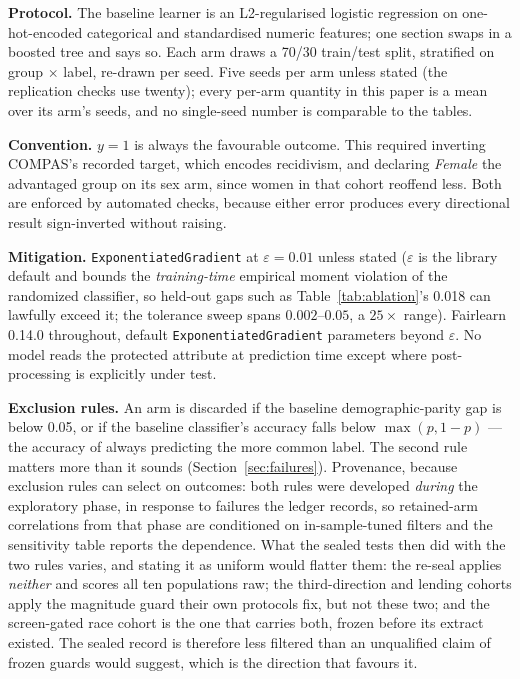 \documentclass[conference]{IEEEtran}
\begin{document}
\textbf{Protocol.} The baseline learner is an L2-regularised logistic regression on
one-hot-encoded categorical and standardised numeric features; one section swaps in a
boosted tree and says so. Each arm draws a 70/30 train/test split, stratified on group
$\times$ label, re-drawn per seed. Five seeds per arm unless stated (the replication
checks use twenty); every per-arm quantity in this paper is a mean over its arm's seeds,
and no single-seed number is comparable to the tables.

\textbf{Convention.} $y = 1$ is always the favourable outcome. This required inverting COMPAS's
recorded target, which encodes recidivism, and declaring \emph{Female} the advantaged group on
its sex arm, since women in that cohort reoffend less. Both are enforced by automated checks,
because either error produces every directional result sign-inverted without raising.

\textbf{Mitigation.} \texttt{ExponentiatedGradient} \cite{agarwal2018} at $\varepsilon = 0.01$
unless stated ($\varepsilon$ is the library default and bounds the \emph{training-time}
empirical moment violation of the randomized classifier, so held-out gaps such as
Table~\ref{tab:ablation}'s 0.018 can lawfully exceed it; the tolerance sweep spans
$0.002$--$0.05$, a $25\times$ range). Fairlearn 0.14.0 throughout, default
\texttt{ExponentiatedGradient} parameters beyond $\varepsilon$. No model reads the protected attribute at prediction time except where
post-processing is explicitly under test.

\textbf{Exclusion rules.} An arm is discarded if the baseline demographic-parity gap is below
0.05, or if the baseline classifier's accuracy falls below $\max(p, 1-p)$ --- the accuracy of
always predicting the more common label. The second rule matters more than it sounds
(Section~\ref{sec:failures}). Provenance, because exclusion rules can select on outcomes:
both rules were developed \emph{during} the exploratory phase, in response to failures the
ledger records, so retained-arm correlations from that phase are conditioned on
in-sample-tuned filters and the sensitivity table reports the dependence. What the sealed
tests then did with the two rules varies, and stating it as uniform would flatter them: the
re-seal applies \emph{neither} and scores all ten populations raw; the third-direction and
lending cohorts apply the magnitude guard their own protocols fix, but not these two; and
the screen-gated race cohort is the one that carries both, frozen before its extract
existed. The sealed record is therefore less filtered than an unqualified claim of frozen
guards would suggest, which is the direction that favours it.
\end{document}
